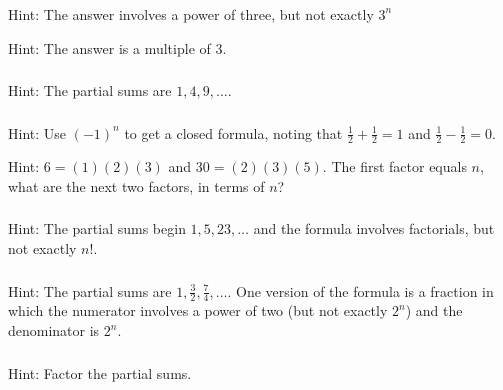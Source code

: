 \subsubsection*{ \answers}
\begin{apart}
    \item Hint: The answer involves a power of three, but not exactly $3^n$
    \item Hint: The answer is a multiple of 3.
\end{apart}

\subsubsection*{ \answers}
Hint: The partial sums are $1, 4, 9, \ldots$.

\subsubsection*{ \answers}
\begin{apart}
    \item Hint: Use $(-1)^n$ to get a closed formula, noting that $\frac{1}{2} + \frac{1}{2} =1$ and $\frac{1}{2} - \frac{1}{2} =0$.
    \item Hint: $6 = (1)(2)(3)$ and $30 = (2)(3)(5)$.  The first factor equals $n$, what are the next two factors, in terms of $n$?
\end{apart}

\subsubsection*{ \answers}
Hint: The partial sums begin $1, 5, 23, \ldots$ and the formula involves factorials, but not exactly $n!$.

\subsubsection*{ \answers}
 Hint: The partial sums are $1, \frac{3}{2}, \frac{7}{4}, \ldots$. One version of the formula is a fraction in which the numerator involves a power of two (but not exactly $2^n$) and the denominator is $2^n$.  

\subsubsection*{ \answers}
Hint: Factor the partial sums.


